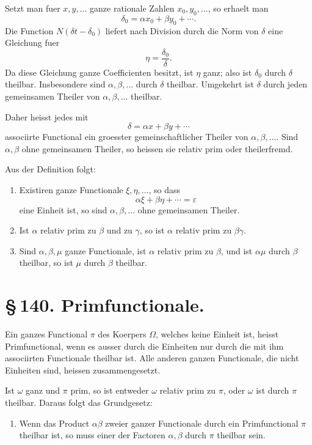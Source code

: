 \documentclass[11pt]{article}
\begin{document}
Setzt man fuer \(x,y,\ldots\) ganze rationale Zahlen
\(x_0,y_0,\ldots\), so erhaelt man
\[
\delta_0=\alpha x_0+\beta y_0+\cdots.
\]
Die Function \(N(\delta t-\delta_0)\) liefert nach Division durch die
Norm von \(\delta\) eine Gleichung fuer
\[
\eta=\frac{\delta_0}{\delta}.
\]
Da diese Gleichung ganze Coefficienten besitzt, ist \(\eta\) ganz;
also ist \(\delta_0\) durch \(\delta\) theilbar. Insbesondere sind
\(\alpha,\beta,\ldots\) durch \(\delta\) theilbar. Umgekehrt ist
\(\delta\) durch jeden gemeinsamen Theiler von \(\alpha,\beta,\ldots\)
theilbar.

Daher heisst jedes mit
\[
\delta=\alpha x+\beta y+\cdots
\]
associirte Functional ein groesster gemeinschaftlicher Theiler von
\(\alpha,\beta,\ldots\). Sind \(\alpha,\beta\) ohne gemeinsamen
Theiler, so heissen sie relativ prim oder theilerfremd.

Aus der Definition folgt:
\begin{enumerate}[label=\arabic*.]
\item Existiren ganze Functionale \(\xi,\eta,\ldots\), so dass
\[
\alpha\xi+\beta\eta+\cdots=\varepsilon
\]
eine Einheit ist, so sind \(\alpha,\beta,\ldots\) ohne gemeinsamen
Theiler.

\item Ist \(\alpha\) relativ prim zu \(\beta\) und zu \(\gamma\), so
ist \(\alpha\) relativ prim zu \(\beta\gamma\).

\item Sind \(\alpha,\beta,\mu\) ganze Functionale, ist \(\alpha\)
relativ prim zu \(\beta\), und ist \(\alpha\mu\) durch \(\beta\)
theilbar, so ist \(\mu\) durch \(\beta\) theilbar.
\end{enumerate}

\section*{\S\,140. Primfunctionale.}

Ein ganzes Functional \(\pi\) des Koerpers \(\Omega\), welches keine
Einheit ist, heisst Primfunctional, wenn es ausser durch die
Einheiten nur durch die mit ihm associirten Functionale theilbar ist.
Alle anderen ganzen Functionale, die nicht Einheiten sind, heissen
zusammengesetzt.

Ist \(\omega\) ganz und \(\pi\) prim, so ist entweder \(\omega\)
relativ prim zu \(\pi\), oder \(\omega\) ist durch \(\pi\) theilbar.
Daraus folgt das Grundgesetz:
\begin{enumerate}[label=\arabic*.]
\item Wenn das Product \(\alpha\beta\) zweier ganzer Functionale durch
ein Primfunctional \(\pi\) theilbar ist, so muss einer der Factoren
\(\alpha,\beta\) durch \(\pi\) theilbar sein.
\end{enumerate}
\end{document}
